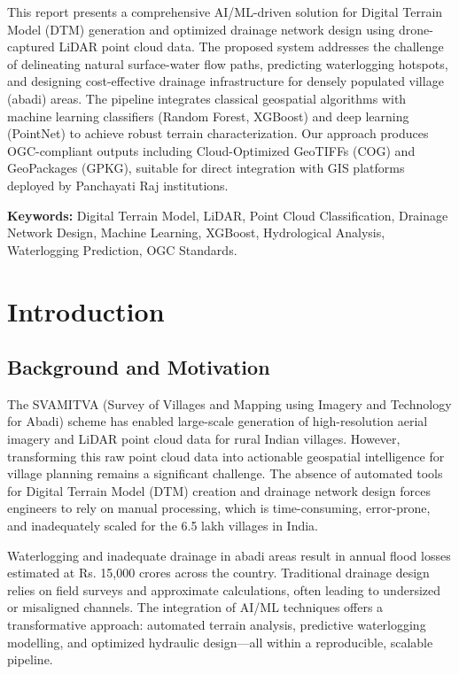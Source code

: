 \documentclass[a4paper,12pt]{article}
\begin{document}
This report presents a comprehensive AI/ML-driven solution for Digital Terrain Model (DTM) generation and optimized drainage network design using drone-captured LiDAR point cloud data. The proposed system addresses the challenge of delineating natural surface-water flow paths, predicting waterlogging hotspots, and designing cost-effective drainage infrastructure for densely populated village (abadi) areas. The pipeline integrates classical geospatial algorithms with machine learning classifiers (Random Forest, XGBoost) and deep learning (PointNet) to achieve robust terrain characterization. Our approach produces OGC-compliant outputs including Cloud-Optimized GeoTIFFs (COG) and GeoPackages (GPKG), suitable for direct integration with GIS platforms deployed by Panchayati Raj institutions.

\textbf{Keywords:} Digital Terrain Model, LiDAR, Point Cloud Classification, Drainage Network Design, Machine Learning, XGBoost, Hydrological Analysis, Waterlogging Prediction, OGC Standards.

\newpage

\section{Introduction}

\subsection{Background and Motivation}

The SVAMITVA (Survey of Villages and Mapping using Imagery and Technology for Abadi) scheme has enabled large-scale generation of high-resolution aerial imagery and LiDAR point cloud data for rural Indian villages. However, transforming this raw point cloud data into actionable geospatial intelligence for village planning remains a significant challenge. The absence of automated tools for Digital Terrain Model (DTM) creation and drainage network design forces engineers to rely on manual processing, which is time-consuming, error-prone, and inadequately scaled for the 6.5 lakh villages in India.

Waterlogging and inadequate drainage in abadi areas result in annual flood losses estimated at Rs. 15,000 crores across the country. Traditional drainage design relies on field surveys and approximate calculations, often leading to undersized or misaligned channels. The integration of AI/ML techniques offers a transformative approach: automated terrain analysis, predictive waterlogging modelling, and optimized hydraulic design---all within a reproducible, scalable pipeline.
\end{document}
